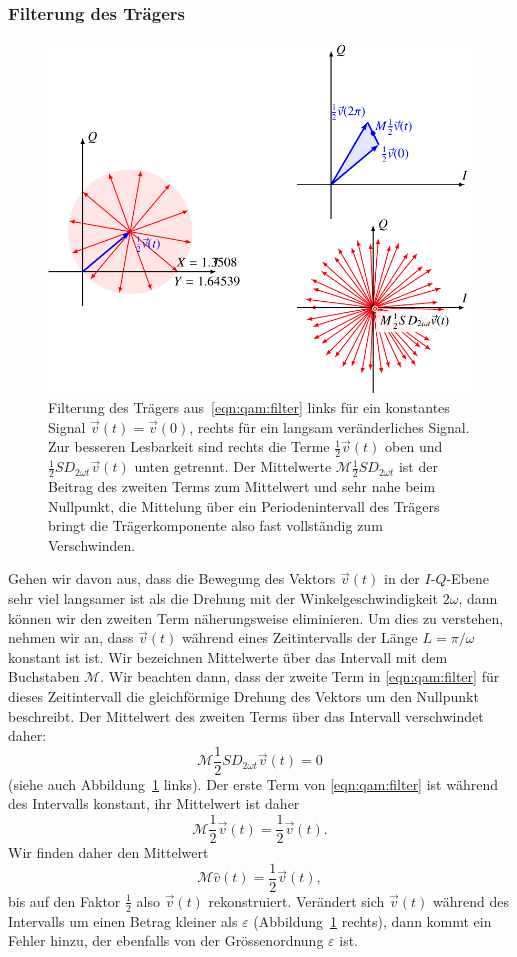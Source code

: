 \subsubsection{Filterung des Trägers}
\begin{figure}
\centering
\includegraphics{applications/qam/images/filter.pdf}
\caption{Filterung des Trägers aus~\eqref{eqn:qam:filter}
links für ein konstantes Signal $\vec{v}(t)=\vec{v}(0)$, rechts
für ein langsam veränderliches Signal.
Zur besseren Lesbarkeit sind rechts die Terme
$\frac12\vec{v}(t)$ oben und $\frac12SD_{2\omega t}\vec{v}(t)$
unten getrennt.
Der Mittelwerte $\mathcal{M}\frac12SD_{2\omega t}$ ist der Beitrag des
zweiten Terms zum Mittelwert und sehr nahe beim Nullpunkt,
die Mittelung über ein Periodenintervall des Trägers bringt die
Trägerkomponente also fast vollständig zum Verschwinden.
\label{figure:qam:filter}}
\end{figure}
Gehen wir davon aus, dass die Bewegung des Vektors $\vec{v}(t)$ in
der $I$-$Q$-Ebene sehr viel langsamer ist als die Drehung mit der
Winkelgeschwindigkeit $2\omega$, dann können wir den zweiten Term
näherungsweise eliminieren.
Um dies zu verstehen, nehmen wir an, dass $\vec{v}(t)$ während eines
Zeitintervalls der Länge $L=\pi/\omega$ konstant ist ist.
Wir bezeichnen Mittelwerte über das Intervall mit dem Buchstaben $\mathcal{M}$.
Wir beachten dann, dass der zweite Term in \eqref{eqn:qam:filter}
für dieses Zeitintervall die gleichförmige Drehung des Vektors
um den Nullpunkt beschreibt.
Der Mittelwert des zweiten Terms über das Intervall verschwindet daher:
\[
\mathcal{M}\frac12SD_{2\omega t}\vec{v}(t)
=
0
\]
(siehe auch Abbildung~\ref{figure:qam:filter} links).
Der erste Term von \eqref{eqn:qam:filter} ist während des Intervalls
konstant, ihr Mittelwert ist daher
\[
\mathcal{M}\frac12\vec{v}(t)
=
\frac12\vec{v}(t).
\]
Wir finden daher den Mittelwert
\[
\mathcal{M}\hat{v}(t)
=
\frac12\vec{v}(t),
\]
bis auf den Faktor $\frac12$ also $\vec{v}(t)$ rekonstruiert.
Verändert sich $\vec{v}(t)$ während des Intervalls um einen Betrag
kleiner als $\varepsilon$ (Abbildung~\ref{figure:qam:filter} rechts),
dann kommt ein Fehler hinzu, der ebenfalls
von der Grössenordnung $\varepsilon$ ist.


